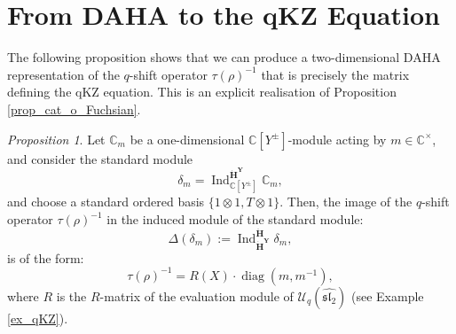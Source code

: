 \documentclass[a4paper]{report}
\theoremstyle{theorem}
\theoremstyle{definition}
\theoremstyle{remark}
\theoremstyle{proposition}
\newtheorem{proposition}{Proposition}
\theoremstyle{conjecture}
\theoremstyle{lemma}
\theoremstyle{corollary}
\theoremstyle{exercise}
\theoremstyle{example}
\newcommand{\C}{\mathbb{C}}
\newcommand{\mcal}{\mathcal}
\newcommand{\on}{\operatorname}
\begin{document}
  \section{From DAHA to the qKZ Equation}
  
  The following proposition shows that we can produce a two-dimensional DAHA
  representation of the $q$-shift operator $\tau(\rho)^{-1}$ that is 
  precisely the matrix defining the qKZ equation. This is an explicit
  realisation of Proposition \ref{prop_cat_o_Fuchsian}.
  
  \begin{proposition}\label{prop_qkz_daha}
      Let $\C_m$ be a one-dimensional $\C[Y^\pm]$-module acting by 
      $m\in \C^\times$, and consider the standard 
      module $$\delta_m = \on{Ind}_{\C[Y^\pm]}^{\mathbf{\dot{H}}^{\mathbf{Y}}} \C_m,$$
      and choose a standard ordered basis $\lbrace 1\otimes 1, T\otimes 1\rbrace$. 
      Then, the image of the $q$-shift operator $\tau(\rho)^{-1}$ in the 
      induced module of the standard module:
      $$\Delta(\delta_m) := \on{Ind}_{\mathbf{\dot{H}}^{\mathbf{Y}}}^{\mathbf{\ddot{\mathbf{H}}}} \delta_m,$$
      is of the form:
      $$\tau(\rho)^{-1} = R(X) \cdot \on{diag}(m,m^{-1}),$$
      where $R$ is the $R$-matrix of the evaluation module of 
      $\mcal{U}_q(\widehat{\mathfrak{sl}_2})$ (see Example \ref{ex_qKZ}). 
  \end{proposition}
\end{document}
